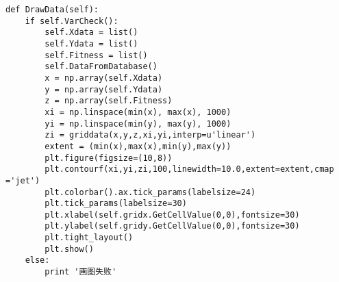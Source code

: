 \begin{lstlisting}
def DrawData(self):  
    if self.VarCheck():
        self.Xdata = list()
        self.Ydata = list()
        self.Fitness = list()
        self.DataFromDatabase()
        x = np.array(self.Xdata)
        y = np.array(self.Ydata)
        z = np.array(self.Fitness)
        xi = np.linspace(min(x), max(x), 1000)
        yi = np.linspace(min(y), max(y), 1000)
        zi = griddata(x,y,z,xi,yi,interp=u'linear')
        extent = (min(x),max(x),min(y),max(y))
        plt.figure(figsize=(10,8)) 
        plt.contourf(xi,yi,zi,100,linewidth=10.0,extent=extent,cmap ='jet')
        plt.colorbar().ax.tick_params(labelsize=24) 
        plt.tick_params(labelsize=30) 
        plt.xlabel(self.gridx.GetCellValue(0,0),fontsize=30) 
        plt.ylabel(self.gridy.GetCellValue(0,0),fontsize=30) 
        plt.tight_layout()
        plt.show()
    else:
        print '画图失败'  
\end{lstlisting}
